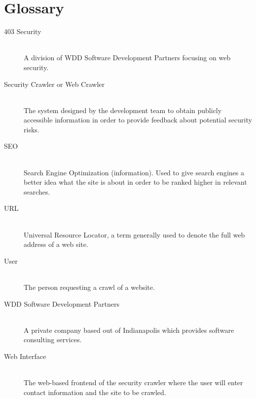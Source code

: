 \section{Glossary}
\begin{description}
    \item[403 Security] \hfill \\
        A division of WDD Software Development Partners focusing on web security.
    \item[Security Crawler or Web Crawler] \hfill \\
        The system designed by the development team to obtain publicly accessible information in order to provide feedback about potential security risks.
    \item[SEO]\hfill \\
        Search Engine Optimization (information).  Used to give search engines a better idea what the site is about in order to be ranked higher in relevant searches.
    \item[URL]\hfill \\
Universal Resource Locator, a term generally used to denote the full web address of a web site.
\item[User]\hfill \\
The person requesting a crawl of a website.
\item[WDD Software Development Partners]\hfill \\
A private company based out of Indianapolis which provides software consulting services.
\item[Web Interface] \hfill \\
The web-based frontend of the security crawler where the user will enter contact information and the site to be crawled.

\end{description}
